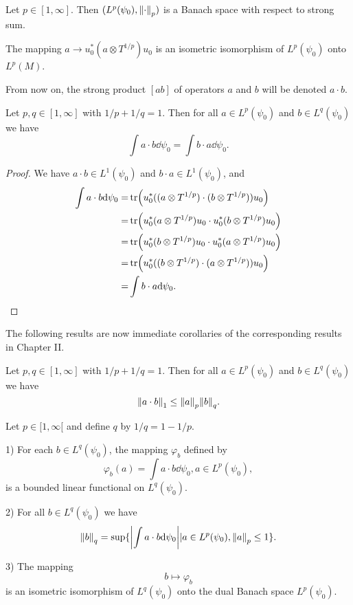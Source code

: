 \begin{theorem}\label{Chap4: Thm: 12}
    Let $p\in [1,\infty]$. Then $(L^p(\psi_0),\norm{\cdot}_p)$ is a Banach space with respect to strong sum. \par
    The mapping $a\to u_0^*(a\otimes T^{1/p})u_0$ is an isometric isomorphism of $L^p(\psi_0)$ onto $L^p(M)$.
\end{theorem}
\begin{notation}
    From now on, the strong product $[ab]$ of operators $a$ and $b$ will be denoted $a\cdot b$.
\end{notation}
\begin{proposition}
    Let $p,q\in [1,\infty]$ with $1/p + 1/q=1$. Then for all $a\in L^p(\psi_0)$ and $b\in L^q(\psi_0)$ we have
    \[
        \int a\cdot b\dd \psi_0= \int b\cdot a\dd \psi_0.
    \]
\end{proposition}
\begin{proof}
    We have $a\cdot b\in L^1(\psi_0)$ and $b\cdot a\in L^1(\psi_0)$, and
    \[
        \begin{split}
            \int a\cdot b\dd \psi_0=&\tr(u_0^*((a\otimes T^{1/p})\cdot (b\otimes T^{1/p}))u_0)\\
            =&\tr(u_0^*(a\otimes T^{1/p})u_0\cdot u_0^*(b\otimes T^{1/p})u_0)\\
            =&\tr(u_0^*(b\otimes T^{1/p})u_0\cdot u_0^*(a\otimes T^{1/p})u_0)\\
            =&\tr(u_0^*((b\otimes T^{1/p})\cdot (a\otimes T^{1/p}))u_0)\\
            =&\int b\cdot a\dd \psi_0.
        \end{split}
    \]
\end{proof}
The following results are now immediate corollaries of the corresponding results in Chapter II.
\begin{proposition}
    Let $p,q\in [1,\infty]$ with $1/p + 1/q = 1$. Then for all $a\in L^p(\psi_0)$ and $b\in L^q(\psi_0)$ we have
    \[
        \norm{a\cdot b}_1\leq \norm{a}_p\norm{b}_q.
    \]
\end{proposition}
\begin{theorem}
    Let $p\in [1,\infty[$ and define $q$ by $1/q=1-1/p$.\par
    1) For each $b\in L^q(\psi_0)$, the mapping $\varphi_b$ defined by
    \[
        \varphi_b(a)=\int a\cdot b\dd \psi_0,a\in L^p(\psi_0),
    \]
    is a bounded linear functional on $L^q(\psi_0)$.\par
    2) For all $b\in L^q(\psi_0)$ we have
    \[
        \norm{b}_q=\sup\{\abs{\int a\cdot b\dd \psi_0}|a\in L^p(\psi_0),\norm{a}_p\leq 1\}.
    \]\par
    3) The mapping
    \[
        b\mapsto \varphi_b
    \]
    is an isometric isomorphism of $L^q(\psi_0)$ onto the dual Banach space $L^p(\psi_0)$.\par
\end{theorem}
